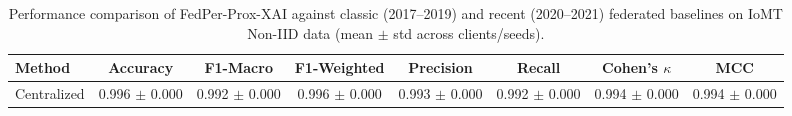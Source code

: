 \begin{table}[t]
\centering
\caption{Performance comparison of FedPer-Prox-XAI against classic (2017--2019) and recent (2020--2021) federated baselines on IoMT Non-IID data (mean $\pm$ std across clients/seeds).}
\label{tab:sota_comparison}
\begin{tabular}{lccccccc}
\toprule
Method & Accuracy & F1-Macro & F1-Weighted & Precision & Recall & Cohen's $\kappa$ & MCC \\
\midrule
Centralized & 0.996 $\pm$ 0.000 & 0.992 $\pm$ 0.000 & 0.996 $\pm$ 0.000 & 0.993 $\pm$ 0.000 & 0.992 $\pm$ 0.000 & 0.994 $\pm$ 0.000 & 0.994 $\pm$ 0.000 \\
\bottomrule
\end{tabular}
\end{table}
